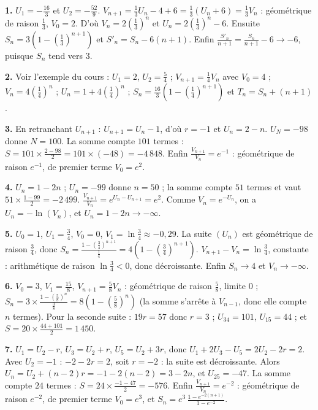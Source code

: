 \begin{corrige}[annales]
\textbf{1.} $U_{1} = -\frac{16}{3}$ et $U_{2} = -\frac{52}{9}$.
$V_{n+1} = \frac13U_{n}-4+6 = \frac13\left(U_{n}+6\right) = \frac13V_{n}$ :
géométrique de raison $\frac13$, $V_{0} = 2$. D'où
$V_{n} = 2\left(\frac13\right)^{n}$ et
$U_{n} = 2\left(\frac13\right)^{n}-6$. Ensuite
$S_{n} = 3\left(1-\left(\frac13\right)^{n+1}\right)$ et
$S'_{n} = S_{n}-6(n+1)$. Enfin
$\frac{S'_{n}}{n+1} = \frac{S_{n}}{n+1}-6 \to -6$, puisque $S_{n}$ tend
vers $3$.

\textbf{2.} Voir l'exemple du cours : $U_{1} = 2$, $U_{2} = \frac54$ ;
$V_{n+1} = \frac14V_{n}$ avec $V_{0} = 4$ ;
$V_{n} = 4\left(\frac14\right)^{n}$ ;
$U_{n} = 1+4\left(\frac14\right)^{n}$ ;
$S_{n} = \frac{16}{3}\left(1-\left(\frac14\right)^{n+1}\right)$ et
$T_{n} = S_{n}+(n+1)$.

\textbf{3.} En retranchant $U_{n+1}$ : $U_{n+1} = U_{n}-1$, d'où
$r = -1$ et $U_{n} = 2-n$. $U_{N} = -98$ donne $N = 100$. La somme compte
$101$ termes : $S = 101\times\frac{2-98}{2} = 101\times(-48) = -4\,848$.
Enfin $\frac{V_{n+1}}{V_{n}} = e^{-1}$ : géométrique de raison $e^{-1}$, de
premier terme $V_{0} = e^{2}$.

\textbf{4.} $U_{n} = 1-2n$ ; $U_{n} = -99$ donne $n = 50$ ; la somme compte
$51$ termes et vaut $51\times\frac{1-99}{2} = -2\,499$. \checkmark
$\frac{V_{n+1}}{V_{n}} = e^{U_{n}-U_{n+1}} = e^{2}$. Comme
$V_{n} = e^{-U_{n}}$, on a $U_{n} = -\ln\left(V_{n}\right)$, et
$U_{n} = 1-2n \to -\infty$.

\textbf{5.} $U_{0} = 1$, $U_{1} = \frac34$, $V_{0} = 0$,
$V_{1} = \ln\frac34 \approx -0{,}29$. La suite $\left(U_{n}\right)$ est
géométrique de raison $\frac34$, donc
$S_{n} = \frac{1-\left(\frac34\right)^{n+1}}{\frac14}
= 4\left(1-\left(\frac34\right)^{n+1}\right)$.
$V_{n+1}-V_{n} = \ln\frac34$, constante : arithmétique de raison
$\ln\frac34<0$, donc décroissante. Enfin $S_{n} \to 4$ et
$V_{n} \to -\infty$.

\textbf{6.} $V_{0} = 3$, $V_{1} = \frac{15}{8}$,
$V_{n+1} = \frac58V_{n}$ : géométrique de raison $\frac58$, limite $0$ ;
$S_{n} = 3\times\frac{1-\left(\frac58\right)^{n}}{\frac38}
= 8\left(1-\left(\frac58\right)^{n}\right)$ (la somme s'arrête à
$V_{n-1}$, donc elle compte $n$ termes). Pour la seconde suite :
$19r = 57$ donc $r = 3$ ; $U_{34} = 101$, $U_{15} = 44$ ; et
$S = 20\times\frac{44+101}{2} = 1\,450$.

\textbf{7.} $U_{1} = U_{2}-r$, $U_{3} = U_{2}+r$, $U_{5} = U_{2}+3r$, donc
$U_{1}+2U_{3}-U_{5} = 2U_{2}-2r = 2$. Avec $U_{2} = -1$ : $-2-2r = 2$, soit
$r = -2$ : la suite est décroissante. Alors
$U_{n} = U_{2}+(n-2)r = -1-2(n-2) = 3-2n$, et $U_{25} = -47$. La somme
compte $24$ termes : $S = 24\times\frac{-1-47}{2} = -576$. Enfin
$\frac{V_{n+1}}{V_{n}} = e^{-2}$ : géométrique de raison $e^{-2}$, de
premier terme $V_{0} = e^{3}$, et
$S_{n} = e^{3}\,\frac{1-e^{-2(n+1)}}{1-e^{-2}}$.


\end{corrige}

